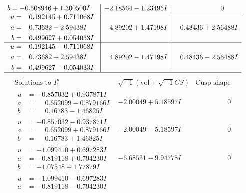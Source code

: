 \documentclass[1p]{elsarticle_modified}
\theoremstyle{definition}
\newcommand{\I}{\sqrt{-1}}
\begin{document}
$$\begin{array}{c|c|c}
\begin{aligned}
b &= -0.508946 + 1.300500 I\end{aligned}
 & -2.18564 - 1.23495 I & \phantom{-0.000000 } 0 \\ \hline\begin{aligned}
u &= \phantom{-}0.192145 + 0.711068 I \\
a &= \phantom{-}0.73682 - 2.59438 I \\
b &= \phantom{-}0.499627 + 0.054033 I\end{aligned}
 & \phantom{-}4.89202 + 1.47198 I & \phantom{-}0.48436 + 2.56488 I \\ \hline\begin{aligned}
u &= \phantom{-}0.192145 - 0.711068 I \\
a &= \phantom{-}0.73682 + 2.59438 I \\
b &= \phantom{-}0.499627 - 0.054033 I\end{aligned}
 & \phantom{-}4.89202 - 1.47198 I & \phantom{-}0.48436 - 2.56488 I\\
 \hline 
 \end{array}$$\newpage$$\begin{array}{c|c|c}  
\text{Solutions to }I^u_{1}& \I (\text{vol} + \sqrt{-1}CS) & \text{Cusp shape}\\
 \hline 
\begin{aligned}
u &= -0.857032 + 0.937871 I \\
a &= \phantom{-}0.652099 - 0.879166 I \\
b &= \phantom{-}0.16783 - 1.46825 I\end{aligned}
 & -2.00049 + 5.18597 I & \phantom{-0.000000 } 0 \\ \hline\begin{aligned}
u &= -0.857032 - 0.937871 I \\
a &= \phantom{-}0.652099 + 0.879166 I \\
b &= \phantom{-}0.16783 + 1.46825 I\end{aligned}
 & -2.00049 - 5.18597 I & \phantom{-0.000000 } 0 \\ \hline\begin{aligned}
u &= -1.099410 + 0.697283 I \\
a &= -0.819118 + 0.794230 I \\
b &= -1.07548 + 1.77879 I\end{aligned}
 & -6.68531 - 9.94778 I & \phantom{-0.000000 } 0 \\ \hline\begin{aligned}
u &= -1.099410 - 0.697283 I \\
a &= -0.819118 - 0.794230 I \\

\end{aligned}
\end{array}$$
\end{document}
